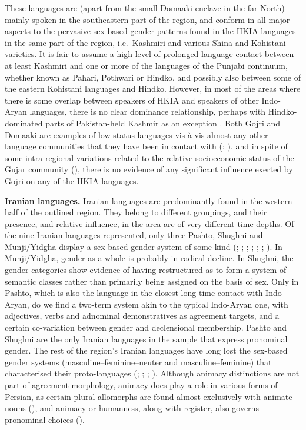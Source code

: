 \documentclass[output=collectionpaper]{langsci/langscibook}
\begin{document}
These languages are (apart from the small Domaaki enclave in the far North) mainly spoken in the southeastern part of the region, and conform in all major aspects to the pervasive sex-based gender patterns found in the HKIA languages in the same part of the region, i.e.\ Kashmiri and various Shina and Kohistani varieties. It is fair to assume a high level of prolonged language contact between at least Kashmiri and one or more of the languages of the Punjabi continuum, whether known as Pahari, Pothwari or Hindko, and possibly also between some of the eastern Kohistani languages and Hindko. However, in most of the areas where there is some overlap between speakers of HKIA and speakers of other Indo-Aryan languages, there is no clear dominance relationship, perhaps with Hindko-dominated parts of Pakistan-held Kashmir as an exception \citep[219]{Rehman2011a}. Both Gojri and Domaaki are examples of low-status languages vis-à-vis almost any other language communities that they have been in contact with (\citealt[2--4]{Losey2002}; \citealt{Weinreich1999}), and in spite of some intra-regional variations related to the relative socioeconomic status of the Gujar community (\citealt[98--99, 143--144]{Hallberg1992}), there is no evidence of any significant influence exerted by Gojri on any of the HKIA languages.

\textbf{Iranian languages.} Iranian languages are predominantly found in the western half of the outlined region. They belong to different groupings, and their presence, and relative influence, in the area are of very different time depths. Of the nine Iranian languages represented, only three \textendash{} Pashto, Shughni and Munji/Yid\-gha \textendash{} display a sex-based gender system of some kind (\citealt{Bashir2009}; \citealt{Edelman2009b,Edelman2009a}; \citealt{Kieffer2003,Kieffer2009}; \citealt[110--167]{Morgenstierne1938}; \citealt{Robson2009}; \citealt{Skjaervo1989}; \citealt{Windfuhr2009}). In Munji/Yidgha, gender as a whole is probably in radical decline. In Shughni, the gender categories show evidence of having restructured as to form a system of semantic classes rather than primarily being assigned on the basis of sex. Only in Pashto, which is also the language in the closest long-time contact with Indo-Aryan, do we find a two-term system akin to the typical Indo-Aryan one, with adjectives, verbs and adnominal demonstratives as agreement targets, and a certain co-variation between gender and declensional membership. Pashto and Shughni are the only Iranian languages in the sample that express pronominal gender. The rest of the region's Iranian languages have long lost the sex-based gender systems (masculine--feminine--neuter and masculine--feminine) that characterised their proto-languages (\citealt[71]{Skjaervo2009a}; \citealt[204]{Skjaervo2009b}; \citealt[288]{Yoshida2009}; \citealt[242--243]{Durkin-Meisterernest2009}). Although animacy distinctions are not part of agreement morphology, animacy does play a role in various forms of Persian, as certain plural allomorphs are found almost exclusively with animate nouns (\citealt[431]{Windfuhr2009}), and animacy or humanness, along with register, also governs pronominal choices (\citealt*[435]{Windfuhr2009}).
\end{document}
